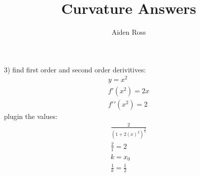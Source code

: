 \documentclass{article}
\title{Curvature Answers}
\author{Aiden Ross}
\begin{document}
\maketitle{}

\hspace{2.0pt}
3)
find first order and second order derivitives:
\begin{gather*}
	y = x^2\\
	f\prime(x^2) = 2x\\
	f′′(x^2) = 2
\end{gather*}
plugin the values:
\begin{gather*}
	\frac{2}{(1+2(x)^2)^\frac{3}{2}}\\
	\frac{2}{1} = 2\\
	k = x_0\\
	\frac{1}{k} = \frac{1}{2}
\end{gather*}
\end{document}
